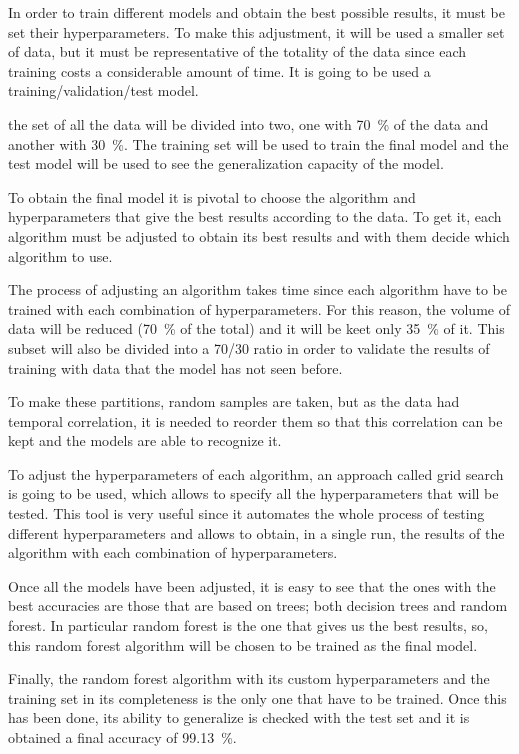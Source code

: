  In order to train different models and obtain the best possible results, it must be set their hyperparameters. To make this adjustment, it will be used a smaller set of data, but it must be representative of the totality of the data since each training costs a considerable amount of time. It is going to be used a training/validation/test model.


the set of all the data will be divided into two, one with \SI{70}{\percent} of the data and another with \SI{30}{\percent}. The training set will be used to train the final model and the test model will be used to see the generalization capacity of the model.


To obtain the final model it is pivotal to choose the algorithm and hyperparameters that give the best results according to the data. To get it, each algorithm must be adjusted to obtain its best results and with them decide which algorithm to use.


The process of adjusting an algorithm takes time since each algorithm have to be trained with each combination of hyperparameters. For this reason, the volume of data will be reduced (\SI{70}{\percent} of the total) and it will be keet only \SI{35}{\percent} of it. This subset will also be divided into a 70/30 ratio in order to validate the results of training with data that the model has not seen before.


To make these partitions, random samples are taken, but as the data had temporal correlation, it is needed to reorder them so that this correlation can be kept and the models are able to recognize it. 


To adjust the hyperparameters of each algorithm, an approach called grid search is going to be used, which allows to specify all the hyperparameters that will be tested. This tool is very useful since it automates the whole process of testing different hyperparameters and allows to obtain, in a single run, the results of the algorithm with each combination of hyperparameters.


Once all the models have been adjusted, it is easy to see that the ones with the best accuracies are those that are based on trees; both decision trees and random forest. In particular random forest is the one that gives us the best results, so, this random forest algorithm will be chosen to be trained as the final model. 


Finally, the random forest algorithm with its custom hyperparameters and the training set in its completeness is the only one that have to be trained. Once this has been done, its ability to generalize is checked with the test set and it is obtained a final accuracy of \SI{99.13}{\percent}. 


